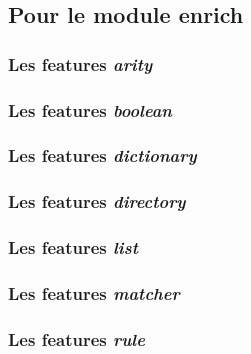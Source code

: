 \documentclass[12pt]{article}
\begin{document}
        \subsection{Pour le module enrich}
        \label{subsec:config-enrich}
        

            \subsubsection{Les features \textit{arity}}
            \label{subsubsec:feature-arity}
            

            \subsubsection{Les features \textit{boolean}}
            \label{subsubsec:feature-boolean}
            

            \subsubsection{Les features \textit{dictionary}}
            \label{subsubsec:feature-dictionary}
            

            \subsubsection{Les features \textit{directory}}
            \label{subsubsec:feature-directory}
            

            \subsubsection{Les features \textit{list}}
            \label{subsubsec:feature-list}
            

            \subsubsection{Les features \textit{matcher}}
            \label{subsubsec:feature-matcher}
            

            \subsubsection{Les features \textit{rule}}
            \label{subsubsec:feature-rule}
            
\end{document}
